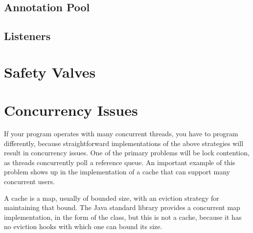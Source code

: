 \subsection{Annotation Pool}

\subsection{Listeners}



\section{Safety Valves}


\section{Concurrency Issues}
\label{sec:lifetime-management-concurrency-issues}

If your program operates with many concurrent threads, you have to program
differently, because straightforward implementations of the above strategies will
result in concurrency issues. One of the primary problems will be lock
contention, as threads concurrently poll a reference queue. An important example
of this problem shows up in the implementation of a cache that can support many
concurrent users.

A cache is a map, usually of bounded size, with an eviction strategy for
maintaining that bound. The Java standard library provides a
concurrent map implementation, in the form of the 
class, but this is not a cache, because it has no eviction hooks with which one
can bound its size.

